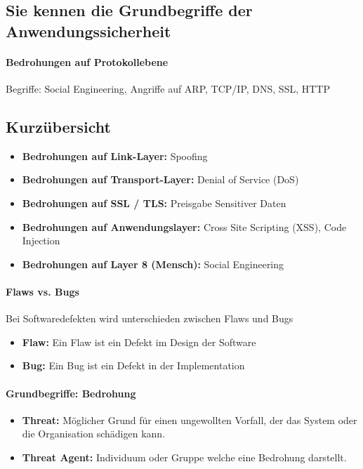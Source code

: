 \documentclass[10pt,a4paper]{article}
\begin{document}
\subsection*{Sie kennen die Grundbegriffe der Anwendungssicherheit}
\paragraph*{Bedrohungen auf Protokollebene}Begriffe: Social Engineering, Angriffe auf ARP, TCP/IP, DNS, SSL, HTTP

\subsection*{Kurzübersicht}
\begin{itemize}[noitemsep,topsep=0pt,leftmargin=*]
    \item \textbf{Bedrohungen auf Link-Layer:} Spoofing
    \item \textbf{Bedrohungen auf Transport-Layer:} Denial of Service (DoS)
    \item \textbf{Bedrohungen auf SSL / TLS:} Preisgabe Sensitiver Daten
    \item \textbf{Bedrohungen auf Anwendungslayer:} Cross Site Scripting (XSS), Code Injection
    \item \textbf{Bedrohungen auf Layer 8 (Mensch):} Social Engineering
\end{itemize}

\paragraph*{Flaws vs. Bugs} Bei Softwaredefekten wird unterschieden zwischen Flaws und Bugs
\begin{itemize}[noitemsep,topsep=0pt,leftmargin=*]
    \item \textbf{Flaw:} Ein Flaw ist ein Defekt im Design der Software
    \item \textbf{Bug:} Ein Bug ist ein Defekt in der Implementation
\end{itemize}

\paragraph*{Grundbegriffe: Bedrohung}
\begin{itemize}[noitemsep,topsep=0pt,leftmargin=*]
    \item \textbf{Threat:} Möglicher Grund für einen ungewollten Vorfall, der das System oder die Organisation schädigen kann.
    \item \textbf{Threat Agent:} Individuum oder Gruppe welche eine Bedrohung darstellt.
\end{itemize}
\end{document}
